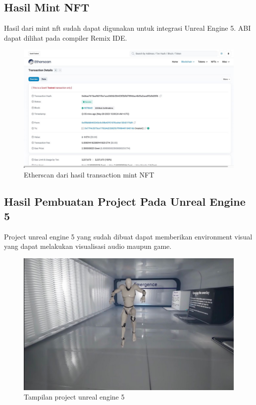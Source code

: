 \subsection{Hasil Mint NFT}
Hasil dari mint nft sudah dapat digunakan untuk integrasi Unreal Engine 5. ABI dapat dilihat pada compiler Remix IDE.
\begin{figure}[H]
  \centering

  \includegraphics[scale=0.35]{gambar/etherscan-deploy.jpg}

  \caption{Etherscan dari hasil transaction mint NFT}
  \label{fig:etherscandeploy}
\end{figure}

\subsection{Hasil Pembuatan Project Pada Unreal Engine 5}
Project unreal engine 5 yang sudah dibuat dapat memberikan environment visual yang dapat melakukan visualisasi audio maupun game.

\begin{figure}[H]
  \centering

  \includegraphics[scale=0.35]{gambar/ue5project.jpg}

  \caption{Tampilan project unreal engine 5}
  \label{fig:ue5project}
\end{figure}

